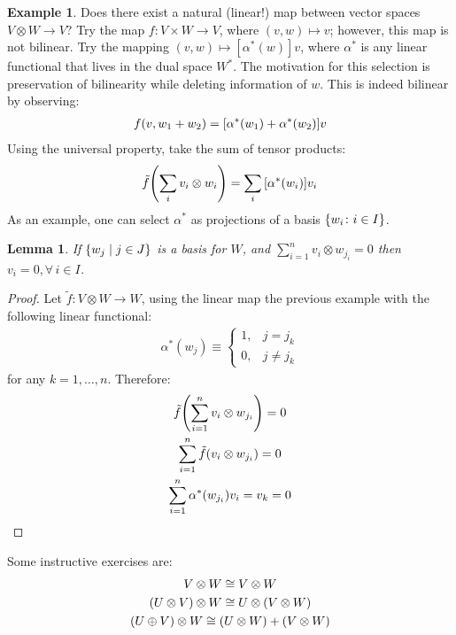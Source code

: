 \documentclass[svgnames]{article}
\newtheorem{Lemma}{Lemma}
\theoremstyle{definition}
\newtheorem*{Example*}{Example}
\theoremstyle{remark}
\theoremstyle{underline}
\theoremstyle{underline}
\begin{document}
	\begin{Example*}
		Does there exist a natural (linear!) map between vector spaces $V \otimes W \to V$? Try the map $f \colon V \times W \to V$, where $(v, w) \mapsto v$; however, this map is not bilinear. Try the mapping $(v,w) \mapsto [\alpha^*(w)]v$, where $\alpha^*$ is any linear functional that lives in the dual space $W^*$. The motivation for this selection is preservation of	bilinearity while deleting information of $w$. This is indeed bilinear by observing:
		\begin{gather*}
			f(v, w_1 + w_2) = \bqty{\alpha^*(w_1) + \alpha^*(w_2)}v
		\end{gather*}
		Using the universal property, take the sum of tensor products:
		\begin{gather*}
			\tilde f\pqty{\sum_{i} v_i \otimes w_i} = \sum_i \bqty{\alpha^*(w_i)}v_i
		\end{gather*}
		As an example, one can select $\alpha^*$ as projections of a basis $\qty{w_i \colon i \in I}$.
	\end{Example*}

		\begin{Lemma}\label{lem:tensProdBasis}
		If $\qty{w_j \mid j \in J}$ is a basis for $W$, and $ \sum\limits_{i=1}^n v_i \otimes w_{j_i} = 0 $	then $v_i = 0, \forall\,i \in I$.
	\end{Lemma}
	\begin{proof}
		Let $\tilde f \colon V \otimes W \to W$, using the linear map the previous example with the following linear functional:
		\begin{gather*}
			\alpha^*(w_j) \equiv 
			\begin{cases}
		        1, & j = j_k \\
		        0, & j \neq j_k 
	        \end{cases}
		\end{gather*}
		for any $k = 1, \ldots, n$. Therefore:
		\begin{gather*}
			\tilde f \pqty{\sum_{i=1}^n v_i \otimes w_{j_i}} = 0\\
			\sum_{i=1}^n \tilde f\pqty{v_i \otimes w_{j_i}} = 0 \\
			\sum_{i=1}^n \alpha^*\pqty{w_{j_i}} v_i = v_k = 0
		\end{gather*}
	\end{proof}

	Some instructive exercises are:
	\begin{gather*}
		V \otimes W \cong V \otimes W \\
		\pqty{U \otimes V} \otimes W \cong U \otimes \pqty{V \otimes W} \\
		\pqty{U \oplus V} \otimes W \cong \pqty{U \otimes W} + \pqty{V \otimes W} 
	\end{gather*}
\end{document}
